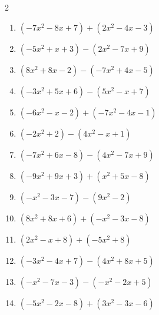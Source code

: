 \begin{multicols}{2}
\begin{enumerate}
  \item $(-7x^{2}-8x+7)+(2x^{2}-4x-3)$


  \item $(-5x^{2}+x+3)-(2x^{2}-7x+9)$


  \item $(8x^{2}+8x-2)-(-7x^{2}+4x-5)$


  \item $(-3x^{2}+5x+6)-(5x^{2}-x+7)$


  \item $(-6x^{2}-x-2)+(-7x^{2}-4x-1)$


  \item $(-2x^{2}+2)-(4x^{2}-x+1)$


  \item $(-7x^{2}+6x-8)-(4x^{2}-7x+9)$


  \item $(-9x^{2}+9x+3)+(x^{2}+5x-8)$


  \item $(-x^{2}-3x-7)-(9x^{2}-2)$


  \item $(8x^{2}+8x+6)+(-x^{2}-3x-8)$


  \item $(2x^{2}-x+8)+(-5x^{2}+8)$


  \item $(-3x^{2}-4x+7)-(4x^{2}+8x+5)$


  \item $(-x^{2}-7x-3)-(-x^{2}-2x+5)$

        \phantom{$=-5x-8$}

\columnbreak %

  \item $(-5x^{2}-2x-8)+(3x^{2}-3x-6)$


\end{enumerate}
\end{multicols}

